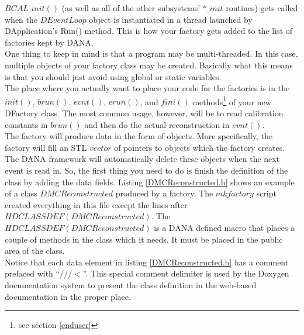 \documentclass[12pt]{article}
\begin{document}


$BCAL\_init()$ (as well as all of the other subsystems' $*\_init$
routines) gets called when the $DEventLoop$ object is instantiated in
a thread launched by DApplication's Run() method. This is how your
factory gets added to the list of factories kept by DANA.\\

One thing to keep in mind is that a program may be multi-threaded.
In this case, multiple objects of your factory class may be created.
Basically what this means is that you should just avoid using global
or static variables.\\

The place where you actually want to place your code for the
factories is in the $init()$, $brun()$, $evnt()$, $erun()$, and $fini()$
methods\footnote{see section \ref{enduser}} of your new DFactory class.
The most common usage, however, will be to read calibration constants in
$brun()$ and then do the actual reconstruction in $evnt()$.\\

The factory will produce data in the form of objects. More specifically,
the factory will fill an STL $vector$ of pointers to objects
which the factory creates. The DANA framework will automatically delete
these objects when the next event is read in. So, the first thing
you need to do is finish the definition of the class by adding the
data fields. Listing \ref{DMCReconstructed.h} shows an example of a class
$DMCReconstructed$ produced by a factory. The $mkfactory$ script created
everything in this file except the lines after $HDCLASSDEF(DMCReconstructed)$.
The $HDCLASSDEF(DMCReconstructed)$
is a DANA defined macro that places a couple of methods in the
class which it needs. It must be placed in the public area of the class.\\

Notice that each data element in listing \ref{DMCReconstructed.h} has a
comment prefaced with ``$///<$''. This special comment delimiter
is used by the Doxygen documentation system to present the class
definition in the web-based documentation in the proper place.\\


\end{document}
